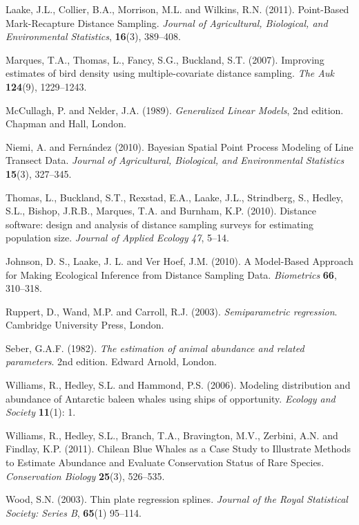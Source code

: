\documentclass[useAMS,referee]{biom}
\begin{document}
\begin{thebibliography}{}
\bibitem{ } Laake, J.L., Collier, B.A., Morrison, M.L. and Wilkins, R.N. (2011). Point-Based Mark-Recapture Distance Sampling. \textit{Journal of Agricultural, Biological, and Environmental Statistics}, \textbf{16}(3), 389--408.

\bibitem{ } Marques, T.A., Thomas, L., Fancy, S.G., Buckland, S.T. (2007). Improving estimates of bird density using multiple-covariate distance sampling. \textit{The Auk} \textbf{124}(9), 1229--1243.

\bibitem{} McCullagh, P. and Nelder, J.A. (1989). \textit{Generalized Linear Models}, 2nd edition. Chapman and Hall, London.

\bibitem{} Niemi, A. and Fern\'andez (2010). Bayesian Spatial Point Process Modeling of Line Transect Data. \textit{Journal of Agricultural, Biological, and Environmental Statistics} \textbf{15}(3), 327--345.

\bibitem{ } Thomas, L., Buckland, S.T., Rexstad, E.A., Laake, J.L., Strindberg, S., Hedley, S.L., Bishop, J.R.B., Marques, T.A. and Burnham, K.P. (2010). Distance software: design and analysis of distance sampling surveys for estimating population size. \textit{Journal of Applied Ecology} \textit{47}, 5--14.

\bibitem{} Johnson, D. S., Laake, J. L. and Ver Hoef, J.M. (2010). A Model-Based Approach for Making Ecological Inference from Distance Sampling Data. \textit{Biometrics} \textbf{66}, 310--318.

\bibitem{} Ruppert, D., Wand, M.P. and Carroll, R.J. (2003). \textit{Semiparametric regression}. Cambridge
University Press, London.

\bibitem{} Seber, G.A.F. (1982). \textit{The estimation of animal abundance and related parameters}. 2nd edition. Edward Arnold, London.

\bibitem{} Williams, R., Hedley, S.L. and Hammond, P.S. (2006). Modeling distribution and abundance of {A}ntarctic baleen whales using ships of opportunity. \textit{Ecology and Society} \textbf{11}(1): 1.

\bibitem{} Williams, R., Hedley, S.L., Branch, T.A., Bravington, M.V., Zerbini, A.N. and Findlay, K.P. (2011). Chilean Blue Whales as a Case Study to Illustrate Methods to Estimate Abundance and Evaluate Conservation Status of Rare Species. \textit{Conservation Biology} \textbf{25}(3), 526--535.

\bibitem{} Wood, S.N. (2003). Thin plate regression splines. \textit{Journal of the Royal Statistical Society: Series B}, \textbf{65}(1) 95--114.


\end{thebibliography}
\end{document}
